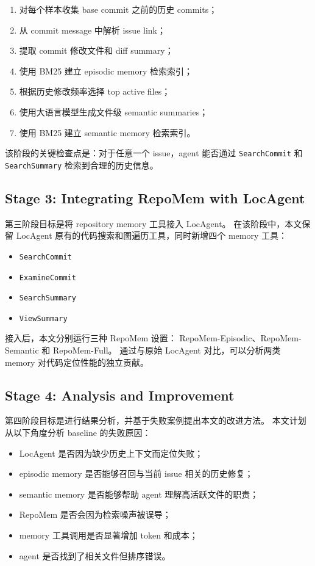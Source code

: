 \documentclass[11pt]{article}
\begin{document}
\begin{enumerate}
    \item 对每个样本收集 base commit 之前的历史 commits；
    \item 从 commit message 中解析 issue link；
    \item 提取 commit 修改文件和 diff summary；
    \item 使用 BM25 建立 episodic memory 检索索引；
    \item 根据历史修改频率选择 top active files；
    \item 使用大语言模型生成文件级 semantic summaries；
    \item 使用 BM25 建立 semantic memory 检索索引。
\end{enumerate}

该阶段的关键检查点是：对于任意一个 issue，agent 能否通过
\texttt{SearchCommit} 和 \texttt{SearchSummary} 检索到合理的历史信息。

\subsection{Stage 3: Integrating RepoMem with LocAgent}
\label{subsec:stage3}

第三阶段目标是将 repository memory 工具接入 LocAgent。
在该阶段中，本文保留 LocAgent 原有的代码搜索和图遍历工具，同时新增四个 memory 工具：

\begin{itemize}
    \item \texttt{SearchCommit}
    \item \texttt{ExamineCommit}
    \item \texttt{SearchSummary}
    \item \texttt{ViewSummary}
\end{itemize}

接入后，本文分别运行三种 RepoMem 设置：
RepoMem-Episodic、RepoMem-Semantic 和 RepoMem-Full。
通过与原始 LocAgent 对比，可以分析两类 memory 对代码定位性能的独立贡献。

\subsection{Stage 4: Analysis and Improvement}
\label{subsec:stage4}

第四阶段目标是进行结果分析，并基于失败案例提出本文的改进方法。
本文计划从以下角度分析 baseline 的失败原因：

\begin{itemize}
    \item LocAgent 是否因为缺少历史上下文而定位失败；
    \item episodic memory 是否能够召回与当前 issue 相关的历史修复；
    \item semantic memory 是否能够帮助 agent 理解高活跃文件的职责；
    \item RepoMem 是否会因为检索噪声被误导；
    \item memory 工具调用是否显著增加 token 和成本；
    \item agent 是否找到了相关文件但排序错误。
\end{itemize}
\end{document}

